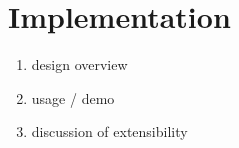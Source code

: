 \section{Implementation}
\begin{enumerate}
\item design overview 
\item usage / demo
\item discussion of extensibility
\end{enumerate}
